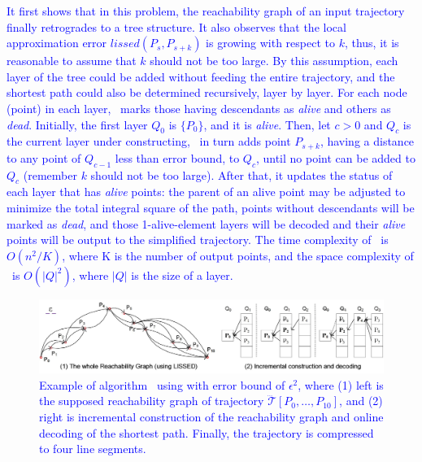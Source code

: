 \textcolor{blue}{It first shows that in this problem, the reachability graph of an input trajectory finally retrogrades to a tree structure. It also observes that the local approximation error $lissed(P_s,P_{s+k})$ is growing with respect to $k$, thus, it is reasonable to assume that $k$ should not be too large. 
By this assumption, each layer of the tree could be added without feeding the entire trajectory, and the shortest path could also be determined recursively, \ie layer by layer.}
%
\textcolor{blue}{For each node (point) in each layer, \dagots~marks those having descendants as \emph{alive} and others as \emph{dead}.
Initially, the first layer $Q_0$ is $\{P_0\}$, and it is \emph{alive}. }
%
\textcolor{blue}{Then, let $c>0$ and $Q_c$ is the current layer under constructing, 
\dagots~in turn adds point $P_{s+k}$, having a \lissed distance to any point of $Q_{c-1}$ less than error bound, to $Q_c$, until no point can be added to $Q_c$ (remember $k$ should not be too large). After that, it updates the status of each layer that has \emph{alive} points: the parent of an alive point may be adjusted to minimize the total integral square \sed of the path, points without descendants will be marked as \emph{dead}, and those 1-alive-element layers will be decoded and their \emph{alive} points will be output to the simplified trajectory. }
%
\textcolor{blue}{The time complexity of \dagots~is $O(n^2/K)$, where K is the number of output points, and the space complexity of \dagots~is $O(|Q|^2)$, where $|Q|$ is the size of a layer.}

\begin{figure}[tb!]
	\centering
	\includegraphics[scale=0.8]{Figures/Fig-DOTS.jpg}
	\vspace{-2ex}
	\caption{\small \textcolor{blue}{Example of algorithm \dagots~using \lissed with error bound of $\epsilon^2$, where (1) left is the supposed reachability graph of trajectory $\dddot{\mathcal{T}}[P_0, \ldots, P_{10}]$, and (2) right is incremental construction of the reachability graph and online decoding of the shortest path. Finally, the trajectory is compressed to four line segments.} }
	\vspace{-1ex}
	\label{fig:dots}
\end{figure}



